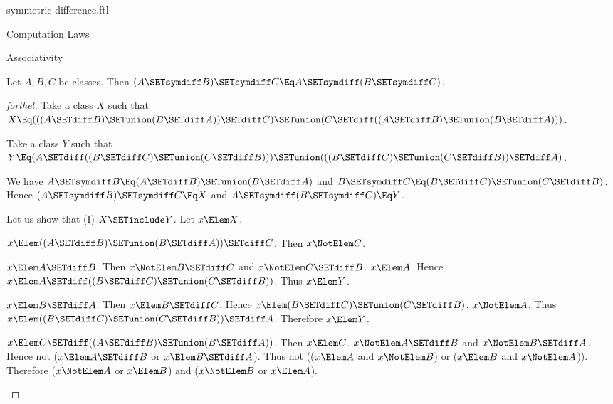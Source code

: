 \documentclass{stex}
\begin{document}
\begin{smodule}{symmetric-difference.ftl}
\begin{sfragment}{Computation Laws}
  \begin{sfragment}{Associativity}
    \begin{proposition}[forthel]
      Let $A, B, C$ be classes.
      Then $(A \SETsymdiff B) \SETsymdiff C \Eq A \SETsymdiff (B \SETsymdiff C)$.
    \end{proposition}
    \begin{proof}[forthel]
      Take a class $X$ such that $X \Eq (((A \SETdiff B) \SETunion (B \SETdiff A)) \SETdiff C) \SETunion (C \SETdiff ((A \SETdiff B) \SETunion (B \SETdiff A)))$.

      Take a class $Y$ such that $Y \Eq (A \SETdiff ((B \SETdiff C) \SETunion (C \SETdiff B))) \SETunion (((B \SETdiff C) \SETunion (C \SETdiff B)) \SETdiff A)$.

      We have $A \SETsymdiff B \Eq (A \SETdiff B) \SETunion (B \SETdiff A)$ and $B \SETsymdiff C \Eq (B \SETdiff C) \SETunion (C \SETdiff B)$.
      Hence $(A \SETsymdiff B) \SETsymdiff C \Eq X$ and $A \SETsymdiff (B \SETsymdiff C) \Eq Y$.

      Let us show that (I) $X \SETinclude Y$.
        Let $x \Elem X$.

        \begin{case}{$x \Elem ((A \SETdiff B) \SETunion (B \SETdiff A)) \SETdiff C$.}
          Then $x \NotElem C$.

          \begin{case}{$x \Elem A \SETdiff B$.}
            Then $x \NotElem B \SETdiff C$ and $x \NotElem C \SETdiff B$. $x \Elem A$.
            Hence $x \Elem A \SETdiff ((B \SETdiff C) \SETunion (C \SETdiff B))$.
            Thus $x \Elem Y$.
          \end{case}

          \begin{case}{$x \Elem B \SETdiff A$.}
            Then $x \Elem B \SETdiff C$.
            Hence $x \Elem (B \SETdiff C) \SETunion (C \SETdiff B)$. $x \NotElem A$.
            Thus $x \Elem ((B \SETdiff C) \SETunion (C \SETdiff B)) \SETdiff A$.
            Therefore $x \Elem Y$.
          \end{case}
        \end{case}

        \begin{case}{$x \Elem C \SETdiff ((A \SETdiff B) \SETunion (B \SETdiff A))$.}
          Then $x \Elem C$.
          $x \NotElem A \SETdiff B$ and $x \NotElem B \SETdiff A$.
          Hence not ($x \Elem A \SETdiff B$ or $x \Elem B \SETdiff A$).
          Thus not (($x \Elem A$ and $x \NotElem B$) or ($x \Elem B$ and $x \NotElem A$)).
          Therefore ($x \NotElem A$ or $x \Elem B$) and ($x \NotElem B$ or $x \Elem A$).


\end{case}
\end{proof}
\end{sfragment}
\end{sfragment}
\end{smodule}
\end{document}
